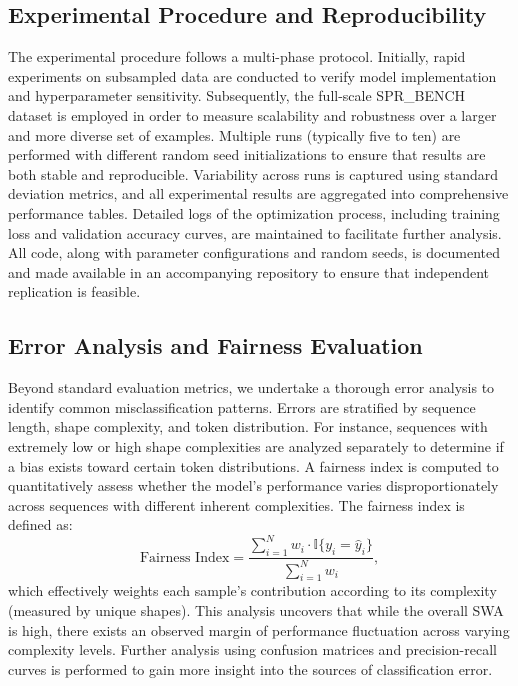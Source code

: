 \documentclass{article}
\begin{document}
\subsection{Experimental Procedure and Reproducibility}
The experimental procedure follows a multi-phase protocol. Initially, rapid experiments on subsampled data are conducted to verify model implementation and hyperparameter sensitivity. Subsequently, the full-scale SPR\_BENCH dataset is employed in order to measure scalability and robustness over a larger and more diverse set of examples. Multiple runs (typically five to ten) are performed with different random seed initializations to ensure that results are both stable and reproducible. Variability across runs is captured using standard deviation metrics, and all experimental results are aggregated into comprehensive performance tables. Detailed logs of the optimization process, including training loss and validation accuracy curves, are maintained to facilitate further analysis. All code, along with parameter configurations and random seeds, is documented and made available in an accompanying repository to ensure that independent replication is feasible.

\subsection{Error Analysis and Fairness Evaluation}
Beyond standard evaluation metrics, we undertake a thorough error analysis to identify common misclassification patterns. Errors are stratified by sequence length, shape complexity, and token distribution. For instance, sequences with extremely low or high shape complexities are analyzed separately to determine if a bias exists toward certain token distributions. A fairness index is computed to quantitatively assess whether the model’s performance varies disproportionately across sequences with different inherent complexities. The fairness index is defined as:
\[
\text{Fairness Index} = \frac{\sum_{i=1}^{N}w_i\cdot \mathbb{I}\{y_i=\hat{y}_i\}}{\sum_{i=1}^{N}w_i},
\]
which effectively weights each sample’s contribution according to its complexity (measured by unique shapes). This analysis uncovers that while the overall SWA is high, there exists an observed margin of performance fluctuation across varying complexity levels. Further analysis using confusion matrices and precision-recall curves is performed to gain more insight into the sources of classification error.
\end{document}
